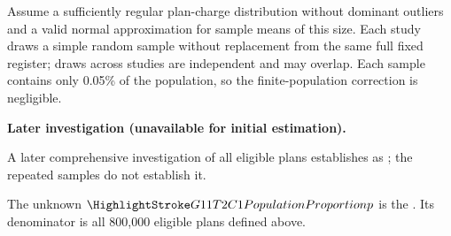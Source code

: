 \begin{probleminfoexcerpt}
Assume a sufficiently regular plan-charge distribution without dominant outliers and a valid normal approximation for sample means of this size. Each study draws a simple random sample without replacement from the same full fixed register; draws across studies are independent and may overlap. Each sample contains only 0.05\% of the population, so the finite-population correction is negligible.
\end{probleminfoexcerpt}

\textbf{Later investigation (unavailable for initial estimation).}

\begin{probleminfoexcerpt}
A later comprehensive investigation of all eligible plans establishes   as   ; the repeated samples do not establish it.
\end{probleminfoexcerpt}

\begingroup\raggedright The unknown $\PP{p}$ is the    . Its denominator is all 800,000 eligible plans defined above.\par\endgroup

